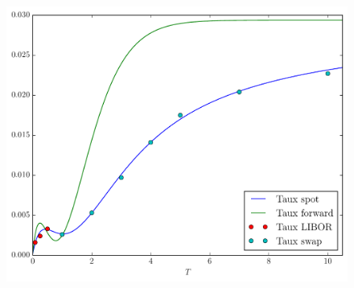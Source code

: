 \begin{figure}
  \centering
  \caption{}
  \label{fig:ns}
  \includegraphics[width=0.3\paperwidth]{../fig/fwd_r.pdf}
\end{figure}










